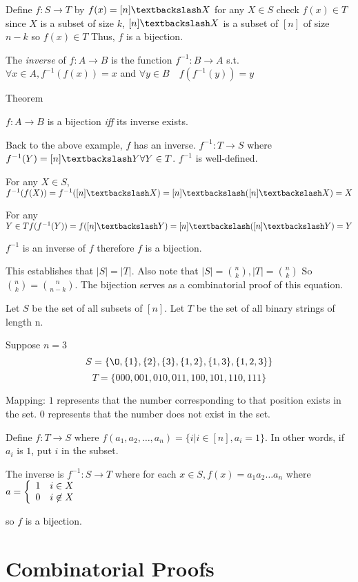 \documentclass{article}
\newcommand{\setn}{$[n]$}
\begin{document}
Define $f:S \rightarrow T$ by $f(x) = [n] \textbackslash X$ for any $X \in S$ check $f(x) \in T$ since $X$ is a subset of size $k$, $[n] \textbackslash X$ is a subset of $[n]$ of size $n-k$ so $f(x) \in T$ Thus, $f$ is a bijection.

The \emph{inverse} of $f:A \rightarrow B$ is the function $f^{-1}:B \rightarrow A$ s.t. $\forall x \in A, f^{-1}(f(x)) = x$ and $\forall y \in B \quad f(f^{-1}(y))=y$

Theorem

$f:A \rightarrow B$ is a bijection \emph{iff} its inverse exists.

Back to the above example, $f$ has an inverse. $f^{-1}:T \rightarrow S$ where $f^{-1}(Y) = [n] \textbackslash Y \forall Y \in T$. $f^{-1}$ is well-defined.

For any $X \in S$, $f^{-1}(f(X)) = f^{-1}([n] \textbackslash X) = [n] \textbackslash ([n] \textbackslash X) = X$

For any $Y \in T f(f^{-1}(Y)) = f([n] \textbackslash Y) = [n] \textbackslash ([n] \textbackslash Y) = Y$

$f^{-1}$ is an inverse of $f$ therefore $f$ is a bijection.

This establishes that $|S| = |T|$. Also note that $|S| = \binom nk, |T| = \binom nk$ So $\binom nk = \binom n{n-k}$. The bijection serves as a combinatorial proof of this equation.

\example
Let $S$ be the set of all subsets of \setn. Let $T$ be the set of all binary strings of length n. 

Suppose $n=3$
$$S=\{\O, \{1\}, \{2\}, \{3\}, \{1,2\},\{1,3\},\{1,2,3\}\}$$
$$T = \{000, 001, 010, 011, 100, 101, 110, 111\} $$

Mapping: $1$ represents that the number corresponding to that position exists in the set. $0$ represents that the number does not exist in the set.

Define $f:T \rightarrow S$ where $f(a_1, a_2, \dots, a_n) = \{i | i \in [n], a_i = 1\}$. In other words, if $a_i$ is $1$, put $i$ in the subset.

The inverse is $f^{-1}:S \rightarrow T$ where for each $x \in S, f(x) = a_1a_2 \dots a_n$ where $a = 
\piecewise{$1$}
	{$i \in X$}
	{$0$}
	{$i \not\in X$}$

so $f$ is a bijection.

\section{Combinatorial Proofs}
\end{document}
